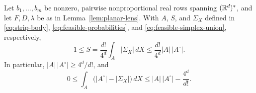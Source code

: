 \begin{proposition}\label{prop:simplex-integral}
Let $b_1,\ldots,b_m$ be nonzero, pairwise nonproportional real rows
spanning $(\mathbb R^d)^*$, and let $F,D,\lambda$ be as in
Lemma~\ref{lem:planar-lens}. With $A$, $S$, and $\Sigma_X$ defined in
\eqref{eq:strip-body}, \eqref{eq:feasible-probabilities}, and
\eqref{eq:feasible-simplex-union}, respectively,
\begin{equation}\label{eq:simplex-integral}
 1\leq S
   =\frac{d!}{4^d}\int_A|\Sigma_X|\,dX
   \leq\frac{d!}{4^d}|A|\,|A^\circ|.
\end{equation}
In particular, $|A|\,|A^\circ|\geq4^d/d!$, and
\begin{equation}\label{eq:simplex-deficit}
 0\leq\int_A\bigl(|A^\circ|-|\Sigma_X|\bigr)\,dX
       \leq |A|\,|A^\circ|-\frac{4^d}{d!}.
\end{equation}
\end{proposition}

